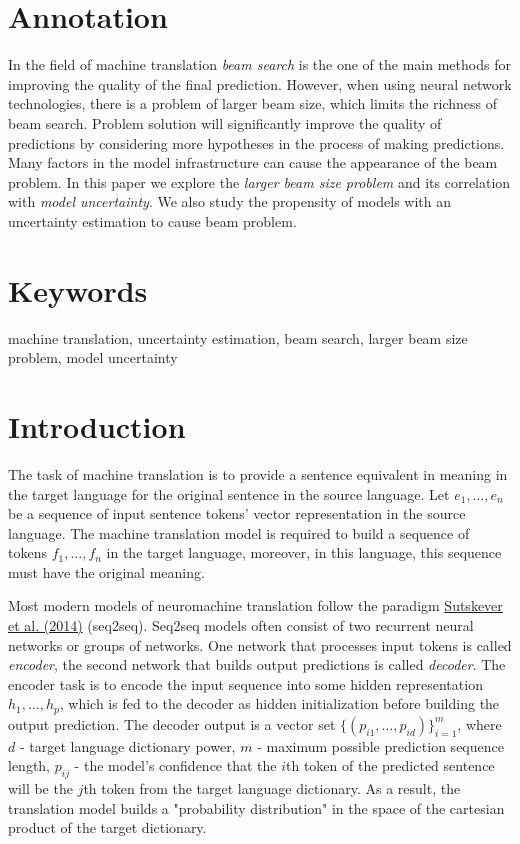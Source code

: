 \documentclass[a4paper,14pt]{extarticle}
\newcommand{\bibref}[3]{\hyperlink{#1}{#2 (#3)}}
\begin{document}
	\newpage

	{
		\hypersetup{linkcolor=black}
		\tableofcontents
	}

	\newpage
	
	\section{Annotation}
	In the field of machine translation \textit{beam search} is the one of the main methods for improving the quality of the final prediction. However, when using neural network technologies, there is a problem of larger beam size, which limits the richness of beam search. Problem solution will significantly improve the quality of predictions by considering more hypotheses in the process of making predictions. Many factors in the model infrastructure can cause the appearance of the beam problem. In this paper we explore the \textit{larger beam size problem} and its correlation with \textit{model uncertainty}. We also study the propensity of models with an uncertainty estimation to cause beam problem.
	
	\section{Keywords}
		machine translation, uncertainty estimation, beam search, larger beam size problem, model uncertainty
		
	\section{Introduction}
	The task of machine translation is to provide a sentence equivalent in meaning in the target language for the original sentence in the source language. Let $e_1, \dots, e_n$ be a sequence of input sentence tokens' vector representation in the source language. The machine translation model is required to build a sequence of tokens $f_1, \dots, f_n$ in the target language, moreover, in this language, this sequence must have the original meaning.
	
	Most modern models of neuromachine translation follow the paradigm \bibref{seq2seq}{Sutskever et al.}{2014} (seq2seq). Seq2seq models often consist of two recurrent neural networks or groups of networks. One network that processes input tokens is called \textit{encoder}, the second network that builds output predictions is called \textit{decoder}. The encoder task is to encode the input sequence into some hidden representation $h_1, \dots, h_p$, which is fed to the decoder as hidden initialization before building the output prediction. The decoder output is a vector set $\{(p_{i1}, \dots, p_{id})\}_{i=1}^{m}$, where $d$ - target language dictionary power, $m$ - maximum possible prediction sequence length, $p_{ij}$ - the model's confidence that the $i$th token of the predicted sentence will be the $j$th token from the target language dictionary. As a result, the translation model builds a "probability distribution" in the space of the cartesian product of the target dictionary.
\end{document}
